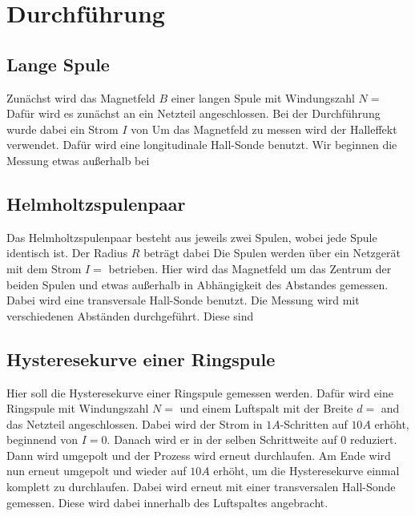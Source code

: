\section{Durchführung}
\label{sec:Durchführung}

\subsection{Lange Spule}
\label{sec:LangeSpule}

Zunächst wird das Magnetfeld $B$ einer langen Spule mit Windungszahl $N = $ %
Dafür wird es zunächst an ein Netzteil angeschlossen. Bei der Durchführung wurde dabei ein Strom $I$ von  %
Um das Magnetfeld zu messen wird der Halleffekt verwendet. %
Dafür wird eine longitudinale Hall-Sonde benutzt.
Wir beginnen die Messung etwas außerhalb bei %

\subsection{Helmholtzspulenpaar}
\label{sec:Spulenpaar}

Das Helmholtzspulenpaar besteht aus jeweils zwei Spulen, wobei jede Spule identisch ist.
Der Radius $R$ beträgt dabei %
Die Spulen werden über ein Netzgerät mit dem Strom $I = $ betrieben. 
Hier wird das Magnetfeld um das Zentrum der beiden Spulen und etwas außerhalb in Abhängigkeit des Abstandes gemessen.
Dabei wird eine transversale Hall-Sonde benutzt.
Die Messung wird mit verschiedenen Abständen durchgeführt.
Diese sind %

\subsection{Hysteresekurve einer Ringspule}
\label{sec:Hysteresekurve}

Hier soll die Hysteresekurve einer Ringspule gemessen werden.
Dafür wird eine Ringspule mit Windungszahl $N = $ und einem Luftspalt mit der Breite $d = $ and das Netzteil angeschlossen.
Dabei wird der Strom in $1A$-Schritten auf $10A$ erhöht, beginnend von $I = 0$.
Danach wird er in der selben Schrittweite auf 0 reduziert.
Dann wird umgepolt und der Prozess wird erneut durchlaufen.
Am Ende wird nun erneut umgepolt und wieder auf $10A$ erhöht, um die Hysteresekurve einmal komplett zu durchlaufen.
Dabei wird erneut mit einer transversalen Hall-Sonde gemessen.
Diese wird dabei innerhalb des Luftspaltes angebracht.